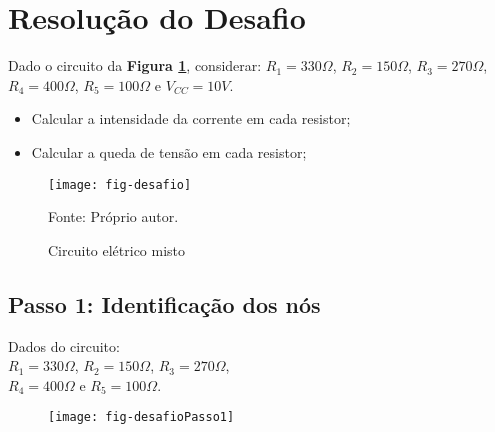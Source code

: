 \section{Resolução do Desafio}

\begin{minipage}{\linewidth}
  \centering
  \begin{minipage}{0.45\linewidth}
    Dado o circuito da \textbf{Figura \ref{fig:resCircuitoDesafio}},
    considerar: $R_1 = 330\Omega$,
                $R_2 = 150\Omega$,
                $R_3 = 270\Omega$, \\
                $R_4 = 400\Omega$,
                $R_5 = 100\Omega$ e
                $V_{CC} = 10V$.
    \begin{itemize}
      \item Calcular a intensidade da corrente em cada resistor;
      \item Calcular a queda de tensão em cada resistor;
    \end{itemize}
  \end{minipage}
  \hspace{0.05\linewidth}
  \begin{minipage}{0.45\linewidth}
    \begin{figure}[H]
      \centering
      \caption{Circuito elétrico misto}
      \label{fig:resCircuitoDesafio}
      \texttt{[image: fig-desafio]}

      {\small Fonte: Próprio autor.}
    \end{figure}
  \end{minipage}
\end{minipage}






\subsection{Passo 1: Identificação dos nós}

\begin{minipage}{\linewidth}
  \centering
  \begin{minipage}{0.45\linewidth}
    Dados do circuito: \\
                $R_1 = 330\Omega$,
                $R_2 = 150\Omega$,
                $R_3 = 270\Omega$, \\
                $R_4 = 400\Omega$ e
                $R_5 = 100\Omega$.
  \end{minipage}
  \hspace{0.05\linewidth}
  \begin{minipage}{0.45\linewidth}
    \begin{figure}[H]
      \centering
      \texttt{[image: fig-desafioPasso1]}
    \end{figure}
  \end{minipage}
\end{minipage}










